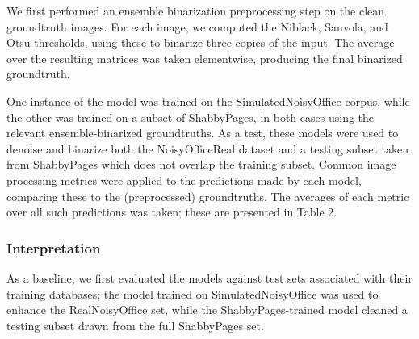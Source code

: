\documentclass[runningheads]{llncs}
\begin{document}
We first performed an ensemble binarization preprocessing step on the clean groundtruth images. For each image, we computed the Niblack, Sauvola, and Otsu thresholds, using these to binarize three copies of the input. The average over the resulting matrices was taken elementwise, producing the final binarized groundtruth.

One instance of the model was trained on the SimulatedNoisyOffice corpus, while the other was trained on a subset of ShabbyPages, in both cases using the relevant ensemble-binarized groundtruths. As a test, these models were used to denoise and binarize both the NoisyOfficeReal dataset and a testing subset taken from ShabbyPages which does not overlap the training subset. Common image processing metrics were applied to the predictions made by each model, comparing these to the (preprocessed) groundtruths. The averages of each metric over all such predictions was taken; these are presented in Table 2.
\begin{table}[]
    \centering
    \caption{Image restoration performance between NoisyOffice-trained and ShabbyPages-trained NAFNet binarizing denoisers on cross-validation task}
    \label{tab:binarization_results}
\end{table}

\subsubsection{Interpretation}
As a baseline, we first evaluated the models against test sets associated with their training databases; the model trained on SimulatedNoisyOffice was used to enhance the RealNoisyOffice set, while the ShabbyPages-trained model cleaned a testing subset drawn from the full ShabbyPages set.
\end{document}

